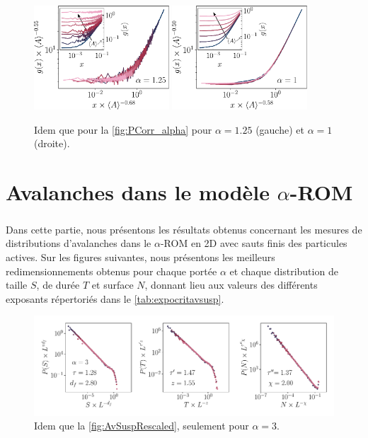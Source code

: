 \begin{figure}[h]
\centering
\includegraphics[width=0.45\textwidth]{Chapitre3/Figures/Interpretation/PCorr/PCorr_rescaled_alpha125_mean.pdf}
\includegraphics[width=0.45\textwidth]{Chapitre3/Figures/Interpretation/PCorr/PCorr_rescaled_alpha1_mean.pdf}
\caption{Idem que pour la \autoref{fig:PCorr_alpha} pour $\alpha = 1.25$ (gauche) et $\alpha = 1$ (droite).}
\label{fig:PCorrAnnexe5}
\end{figure}

\FloatBarrier

\resumetocwriting

\section{Avalanches dans le modèle $\alpha$-ROM}

\label{sec:AvTBLRRAnnexe}

\subparagraph{}Dans cette partie, nous présentons les résultats obtenus concernant les mesures de distributions d'avalanches dans le $\alpha$-ROM en 2D avec sauts finis des particules actives. Sur les figures suivantes, nous présentons les meilleurs redimensionnements obtenus pour chaque portée $\alpha$ et chaque distribution de taille $S$, de durée $T$ et surface $N$, donnant lieu aux valeurs des différents exposants répertoriés dans le \autoref{tab:expocritavsusp}.

\begin{figure}[h]
\centering
\includegraphics[width=\textwidth]{Chapitre3/Figures/Avalanches/Rescale_Av_alpha3.pdf}
\caption{Idem que la \autoref{fig:AvSuspRescaled}, seulement pour $\alpha=3$.}
	\label{fig:annexAv1}
\end{figure}

